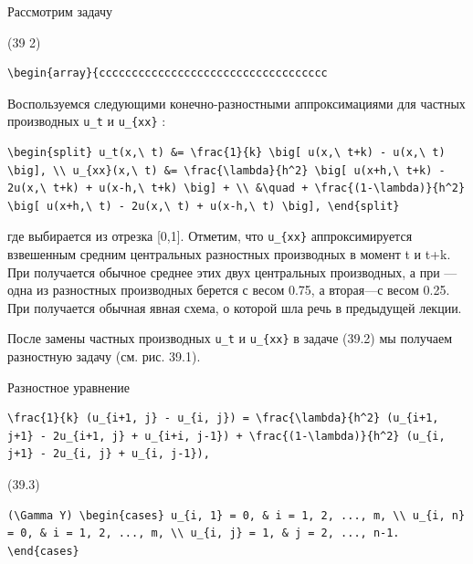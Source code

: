 \documentclass[
  ukrainian,
]{article}
\begin{document}
Рассмотрим задачу

(39 2)

\begin{verbatim}
\begin{array}{ccccccccccccccccccccccccccccccccccc
\end{verbatim}

Воспользуемся следующими конечно-разностными аппроксимациями для частных
производных \texttt{u\_t} и \texttt{u\_\{xx\}} :

\begin{verbatim}
\begin{split} u_t(x,\ t) &= \frac{1}{k} \big[ u(x,\ t+k) - u(x,\ t) \big], \\ u_{xx}(x,\ t) &= \frac{\lambda}{h^2} \big[ u(x+h,\ t+k) - 2u(x,\ t+k) + u(x-h,\ t+k) \big] + \\ &\quad + \frac{(1-\lambda)}{h^2} \big[ u(x+h,\ t) - 2u(x,\ t) + u(x-h,\ t) \big], \end{split}
\end{verbatim}

где \lambda  выбирается из отрезка {[}0,1{]}. Отметим, что
\texttt{u\_\{xx\}} аппроксимируется взвешенным средним центральных
разностных производных в момент t и t+k. При  получается
обычное среднее этих двух центральных производных, а при 
---одна из разностных производных берется с весом 0.75, а вторая---с
весом 0.25. При  получается обычная явная схема, о которой шла
речь в предыдущей лекции.

После замены частных производных \texttt{u\_t} и \texttt{u\_\{xx\}} в
задаче (39.2) мы получаем разностную задачу (см. рис. 39.1).

Разностное уравнение

\begin{verbatim}
\frac{1}{k} (u_{i+1, j} - u_{i, j}) = \frac{\lambda}{h^2} (u_{i+1, j+1} - 2u_{i+1, j} + u_{i+i, j-1}) + \frac{(1-\lambda)}{h^2} (u_{i, j+1} - 2u_{i, j} + u_{i, j-1}),
\end{verbatim}

(39.3)

\begin{verbatim}
(\Gamma Y) \begin{cases} u_{i, 1} = 0, & i = 1, 2, ..., m, \\ u_{i, n} = 0, & i = 1, 2, ..., m, \\ u_{i, j} = 1, & j = 2, ..., n-1. \end{cases}
\end{verbatim}
\end{document}
